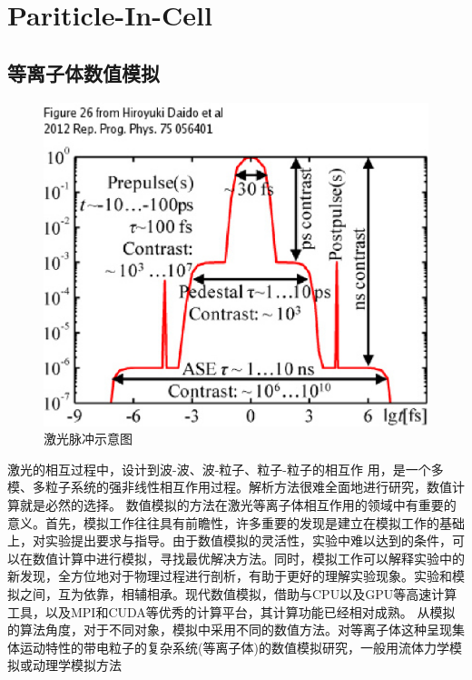 
\chapter{Pariticle-In-Cell}
\label{chap:pic}

\section{等离子体数值模拟}
\begin{figure}[!htbp]
  \centering
  \includegraphics[width=\MyFactor\textwidth]{Img/prepulse2012.eps}
  \caption{激光脉冲示意图}
  \label{fig:prepulse2012}
\end{figure}

激光的相互过程中，设计到波-波、波-粒子、粒子-粒子的相互作
用，是一个多模、多粒子系统的强非线性相互作用过程。解析方法很难全面地进行研究，数值计算就是必然的选择。
数值模拟的方法在激光等离子体相互作用的领域中有重要的意义。首先，模拟工作往往具有前瞻性，许多重要的发现是建立在模拟工作的基础上，对实验提出要求与指导。由于数值模拟的灵活性，实验中难以达到的条件，可以在数值计算中进行模拟，寻找最优解决方法。同时，模拟工作可以解释实验中的新发现，全方位地对于物理过程进行剖析，有助于更好的理解实验现象。实验和模拟之间，互为依靠，相辅相承。现代数值模拟，借助与CPU以及GPU等高速计算工具，以及MPI和CUDA等优秀的计算平台，其计算功能已经相对成熟。
从模拟的算法角度，对于不同对象，模拟中采用不同的数值方法。对等离子体这种呈现集体运动特性的带电粒子的复杂系统(等离子体)的数值模拟研究，一般用流体力学模拟或动理学模拟方法


